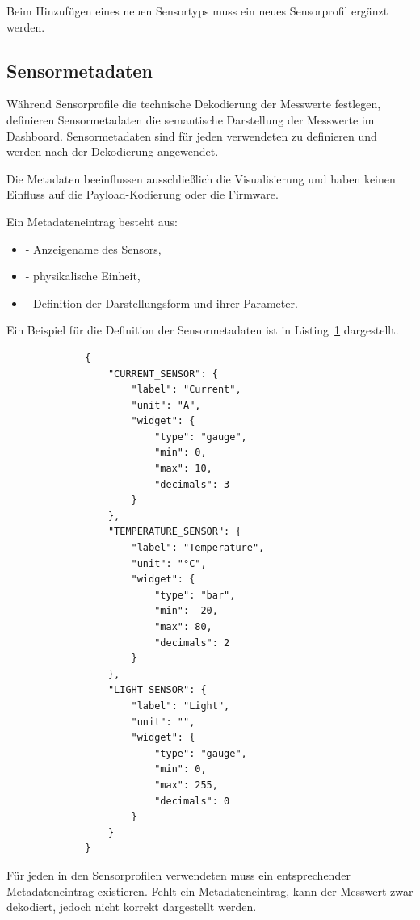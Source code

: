 	Beim Hinzufügen eines neuen Sensortyps muss ein neues Sensorprofil ergänzt werden.

\subsection{Sensormetadaten}

	Während Sensorprofile die technische Dekodierung der Messwerte festlegen, definieren Sensormetadaten die semantische Darstellung der Messwerte im Dashboard. Sensormetadaten sind für jeden verwendeten  zu definieren und werden nach der Dekodierung angewendet.
	
	Die Metadaten beeinflussen ausschlie{\ss}lich die Visualisierung und haben keinen Einfluss auf die Payload-Kodierung oder die Firmware.
	
	Ein Metadateneintrag besteht aus:
	\begin{itemize}
		\item {} - Anzeigename des Sensors,
		\item {} - physikalische Einheit,
		\item {} - Definition der Darstellungsform und ihrer Parameter.
	\end{itemize}
	
	Ein Beispiel für die Definition der Sensormetadaten ist in Listing~\ref{lst:SensorMetadataNodeRed} dargestellt.

\begin{figure}[H]
	\label{lst:SensorMetadataNodeRed}
	\begin{verbatim}
		{
			"CURRENT_SENSOR": {
				"label": "Current",
				"unit": "A",
				"widget": {
					"type": "gauge",
					"min": 0,
					"max": 10,
					"decimals": 3
				}
			},
			"TEMPERATURE_SENSOR": {
				"label": "Temperature",
				"unit": "°C",
				"widget": {
					"type": "bar",
					"min": -20,
					"max": 80,
					"decimals": 2
				}
			},
			"LIGHT_SENSOR": {
				"label": "Light",
				"unit": "",
				"widget": {
					"type": "gauge",
					"min": 0,
					"max": 255,
					"decimals": 0
				}
			}
		}
	\end{verbatim}
\end{figure}

	Für jeden in den Sensorprofilen verwendeten  muss ein entsprechender Metadateneintrag existieren. Fehlt ein Metadateneintrag, kann der Messwert zwar dekodiert, jedoch nicht korrekt dargestellt werden.

